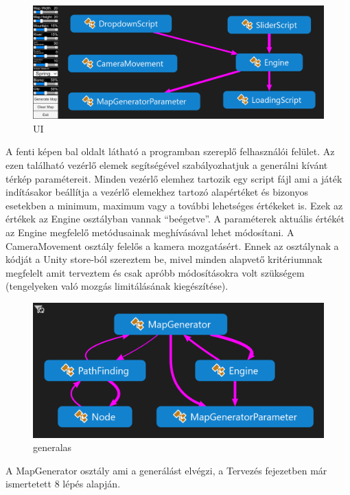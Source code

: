 \begin{figure}[h!]
\centering
\includegraphics[scale=0.6]{kepek/UI.png}
\caption{UI}
\label{fig:UI}
\end{figure}

A fenti képen bal oldalt látható a programban szereplő felhasználói felület. Az ezen található vezérlő elemek segítségével szabályozhatjuk a generálni kívánt térkép paramétereit. Minden vezérlő elemhez tartozik egy script fájl ami a játék indításakor beállítja a vezérlő elemekhez tartozó alapértéket és bizonyos esetekben a minimum, maximum vagy a további lehetséges értékeket is. Ezek az értékek az Engine osztályban vannak “beégetve”. A paraméterek aktuális értékét az Engine megfelelő metódusainak meghívásával lehet módosítani.
\newline
\newline A CameraMovement osztály felelős a kamera mozgatásért. Ennek az osztálynak a kódját a Unity store-ból szereztem be, mivel minden alapvető kritériumnak megfelelt amit terveztem és csak apróbb módosításokra volt szükségem (tengelyeken való mozgás limitálásának kiegészítése). 

\begin{figure}[h!]
\centering
\includegraphics[scale=0.6]{kepek/generalas.png}
\caption{generalas}
\label{fig:generalas}
\end{figure}

A MapGenerator osztály ami a generálást elvégzi, a Tervezés fejezetben már ismertetett 8 lépés alapján.

